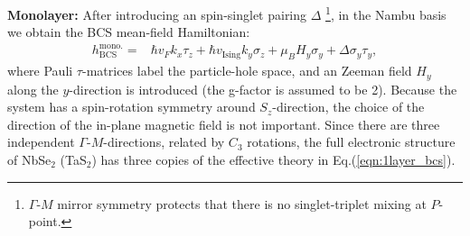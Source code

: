 \vspace{1em}
\textbf{Monolayer:} After introducing an spin-singlet pairing $\Delta$ \footnote{$\Gamma$-$M$ mirror symmetry protects that there is no singlet-triplet mixing at $P$-point.}, in the Nambu basis we obtain the BCS mean-field Hamiltonian:
\begin{align}\label{eqn:1layer_bcs}
    h^{\text{mono.}}_{\text{BCS}}=&\hbar v_F k_x \tau_z+ \hbar v_{\text{Ising}} k_y\sigma_z+\mu_B H_y \sigma_y+\Delta \sigma_y\tau_y,
\end{align}
where Pauli $\tau$-matrices label the particle-hole space, and an Zeeman field $H_y$ along the $y$-direction is introduced (the g-factor is assumed to be 2). Because the system has a spin-rotation symmetry around $S_z$-direction, the choice of the direction of the in-plane magnetic field is not important. Since there are three independent $\Gamma$-$M$-directions, related by $C_3$ rotations, the full electronic structure of NbSe$_2$ (TaS$_2$) has three copies of the effective theory in Eq.(\ref{eqn:1layer_bcs}).
